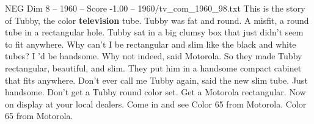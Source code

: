\begin{textsample}{NEG Dim 8 – 1960 – Score -1.00 – 1960/tv\_com\_1960\_98.txt}  \label{ex:f8_neg_039}
This is the story of Tubby, the color \textbf{television} tube.
Tubby was fat and round.
A misfit, a round tube in a rectangular hole.
Tubby sat in a big clumsy box that just didn't seem to fit anywhere.
Why can't I be rectangular and slim like the black and white tubes?
I 'd be handsome.
Why not indeed, said Motorola.
So they made Tubby rectangular, beautiful, and slim.
They put him in a handsome compact cabinet that fits anywhere.
Don't ever call me Tubby again, said the new slim tube.
Just handsome.
Don't get a Tubby round color set.
Get a Motorola rectangular.
Now on display at your local dealers.
Come in and see Color 65 from Motorola.
Color 65 from Motorola.

\end{textsample}
